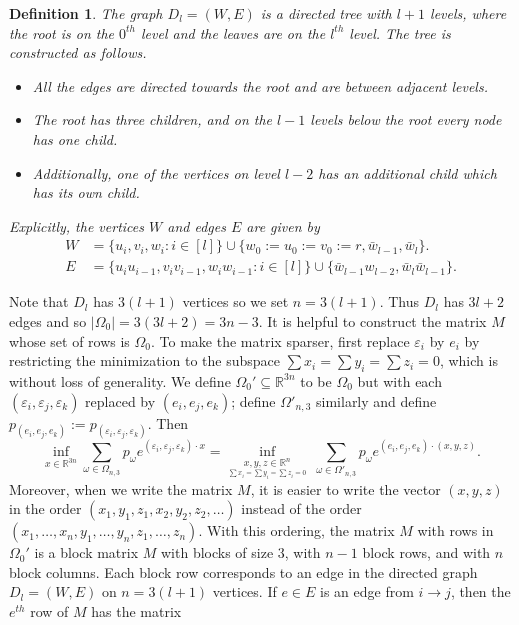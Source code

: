 \documentclass[10pt,a4paper]{article}
\newtheorem{dfn}[thm]{Definition}\crefname{dfn}{Definition}{Definitions}
\numberwithin{equation}{section}
\newcommand{\RR}{\mathbb R}
\newcommand{\eps}{\varepsilon}
\begin{document}
\begin{dfn}\label{dfn:graph}
The graph $D_l = (W,E)$ is a directed tree with $l + 1$ levels, where the root is on the $0^{th}$ level and the leaves are on the $l^{th}$ level. The tree is constructed as follows.
\begin{itemize}
\item All the edges are directed towards the root and are between adjacent levels. 
\item The root has three children, and on the $l-1$ levels below the root every node has one child. 
\item Additionally, one of the vertices on level $l-2$ has an additional child which has its own child. 
\end{itemize}
Explicitly, the vertices $W$ and edges $E$ are given by
\begin{align*}W &= \{u_i, v_i, w_i: i \in [l]\} \cup \{w_0:=u_0:=v_0:=r, \bar{w}_{l-1}, \bar{w}_l\}.\\
 E &= \{u_{i}u_{i-1}, v_{i}v_{i-1}, w_{i}w_{i-1}: i \in [l] \} \cup \{\bar{w}_{l-1} w_{l-2}, \bar{w}_l \bar{w}_{l-1}\}.\end{align*}
\end{dfn}
Note that $D_l$ has $3(l + 1)$ vertices so we set $n = 3(l + 1)$. Thus $D_l$ has $3 l + 2$ edges and so $|\Omega_0| = 3(3l + 2) = 3n - 3.$ It is helpful to construct the matrix $M$ whose set of rows is $\Omega_0$. To make the matrix sparser, first replace $\eps_i$ by $e_i$ by restricting the minimization to the subspace $\sum x_i = \sum y_i = \sum z_i = 0$, which is without loss of generality. We define $\Omega_0' \subseteq \RR^{3n}$ to be $\Omega_0$ but with each $(\eps_i, \eps_j, \eps_k)$ replaced by $(e_i, e_j, e_k)$; define $\Omega'_{n,3}$ similarly and define $p_{(e_i, e_j, e_k)}:=p_{(\eps_i, \eps_j, \eps_k)}$. Then
$$ \inf_{x \in \RR^{3n}} \sum_{\omega \in \Omega_{n,3}} p_{\omega} e^{(\eps_i, \eps_j, \eps_k) \cdot x} =  \inf_{\underset{\sum x_i = \sum y_i = \sum z_i = 0}{x,y,z \in \RR^{n}}} \;\sum_{\omega \in \Omega'_{n,3}} p_{\omega} e^{(e_i, e_j, e_k) \cdot (x,y,z)}.$$
 Moreover, when we write the matrix $M$, it is easier to write the vector $(x,y,z)$ in the order $(x_1,y_1,z_1, x_2,y_2,z_2, \dots )$ instead of the order $(x_1, \dots, x_n, y_1, \dots, y_n, z_1, \dots, z_n)$. With this ordering, the matrix $M$ with rows in $\Omega_0'$ is a block matrix $M$ with blocks of size $3$, with $n-1$ block rows, and with $n$ block columns. Each block row corresponds to an edge in the directed graph $D_l = (W, E)$ on $n = 3(l+1)$ vertices. If $e \in E$ is an edge from $i \to j$, then the $e^{th}$ row of $M$ has the matrix 
\end{document}
